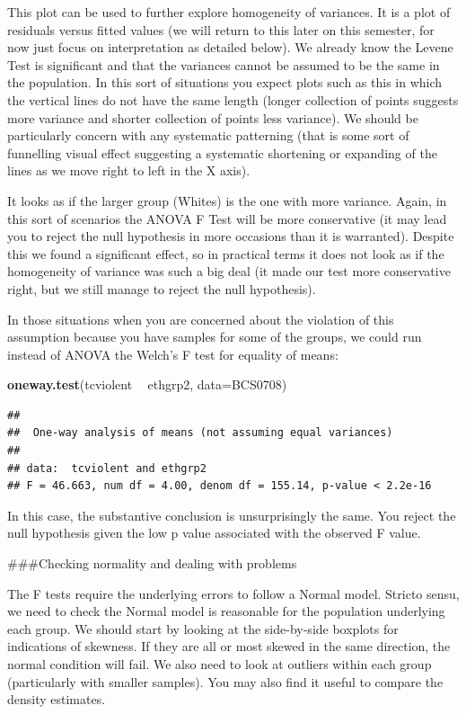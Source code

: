\documentclass[]{book}
\newenvironment{Shaded}{\begin{snugshade}}{\end{snugshade}}
\newcommand{\DataTypeTok}[1]{\textcolor[rgb]{0.13,0.29,0.53}{#1}}
\newcommand{\KeywordTok}[1]{\textcolor[rgb]{0.13,0.29,0.53}{\textbf{#1}}}
\newcommand{\NormalTok}[1]{#1}
\newcommand{\OperatorTok}[1]{\textcolor[rgb]{0.81,0.36,0.00}{\textbf{#1}}}
\newcommand{\StringTok}[1]{\textcolor[rgb]{0.31,0.60,0.02}{#1}}
\theoremstyle{definition}
\theoremstyle{definition}
\theoremstyle{definition}
\theoremstyle{remark}
\begin{document}
This plot can be used to further explore homogeneity of variances. It is
a plot of residuals versus fitted values (we will return to this later
on this semester, for now just focus on interpretation as detailed
below). We already know the Levene Test is significant and that the
variances cannot be assumed to be the same in the population. In this
sort of situations you expect plots such as this in which the vertical
lines do not have the same length (longer collection of points suggests
more variance and shorter collection of points less variance). We should
be particularly concern with any systematic patterning (that is some
sort of funnelling visual effect suggesting a systematic shortening or
expanding of the lines as we move right to left in the X axis).

It looks as if the larger group (Whites) is the one with more variance.
Again, in this sort of scenarios the ANOVA F Test will be more
conservative (it may lead you to reject the null hypothesis in more
occasions than it is warranted). Despite this we found a significant
effect, so in practical terms it does not look as if the homogeneity of
variance was such a big deal (it made our test more conservative right,
but we still manage to reject the null hypothesis).

In those situations when you are concerned about the violation of this
assumption because you have samples for some of the groups, we could run
instead of ANOVA the Welch's F test for equality of means:

\begin{Shaded}
\begin{Highlighting}[]
\KeywordTok{oneway.test}\NormalTok{(tcviolent }\OperatorTok{~}\StringTok{ }\NormalTok{ethgrp2, }\DataTypeTok{data=}\NormalTok{BCS0708)}
\end{Highlighting}
\end{Shaded}

\begin{verbatim}
## 
##  One-way analysis of means (not assuming equal variances)
## 
## data:  tcviolent and ethgrp2
## F = 46.663, num df = 4.00, denom df = 155.14, p-value < 2.2e-16
\end{verbatim}

In this case, the substantive conclusion is unsurprisingly the same. You
reject the null hypothesis given the low p value associated with the
observed F value.

\#\#\#Checking normality and dealing with problems

The F tests require the underlying errors to follow a Normal model.
Stricto sensu, we need to check the Normal model is reasonable for the
population underlying each group. We should start by looking at the
side-by-side boxplots for indications of skewness. If they are all or
most skewed in the same direction, the normal condition will fail. We
also need to look at outliers within each group (particularly with
smaller samples). You may also find it useful to compare the density
estimates.
\end{document}
